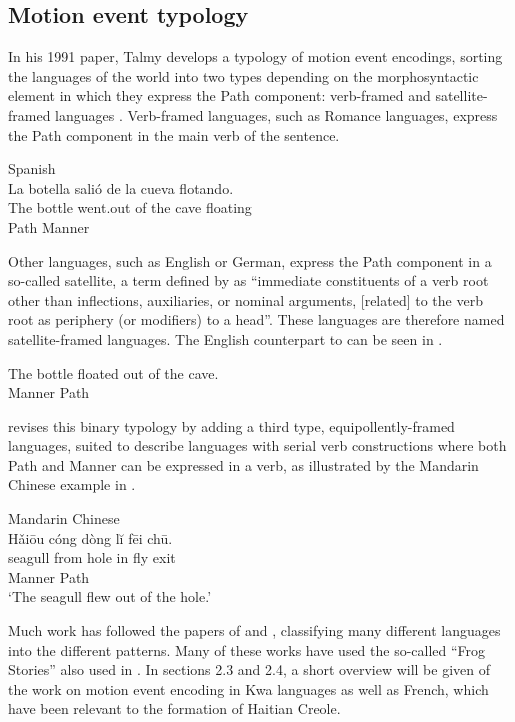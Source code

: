 \documentclass[output=paper,colorlinks,citecolor=brown]{langscibook}
\begin{document}
\subsection{Motion event typology}

In his 1991 paper, Talmy develops a typology of motion event encodings, sorting the languages of the world into two types depending on the morphosyntactic element in which they express the Path component: verb-framed and satellite-framed languages \citep[486--487]{Talmy_1991}. Verb-framed languages, such as Romance languages, express the Path component in the main verb of the sentence.

\ea Spanish \citep[69]{Talmy_1985} \\\label{ex:3:2}
\glll La botella salió de la cueva flotando.\\
      The bottle went.out of the cave floating \\
      {}  {}     Path     {} {} {} Manner\\
\z
	                     	
Other languages, such as English or German, express the Path component in a so-called satellite, a term defined by \citet[102]{Talmy_1985} as “immediate constituents of a verb root other than inflections, auxiliaries, or nominal arguments, [related] to the verb root as periphery (or modifiers) to a head”. These languages are therefore named satellite-framed languages. The English counterpart to  can be seen in .

\ea\label{ex:3:3}
\gll  The bottle floated {out of the cave}.\\
      {}  {}      Manner Path\\
\z
						
\citet{Slobin_2004} revises this binary typology by adding a third type, equipollently-framed languages, suited to describe languages with serial verb constructions where both Path and Manner can be expressed in a verb, as illustrated by the Mandarin Chinese example in .

\ea\label{ex:3:4}Mandarin Chinese\\
\glll  Hǎiōu cóng dòng l\u{i} fēi chū.\\
       seagull from hole in fly exit\\
       {}      {}   {}   {}  Manner Path\\
\glt `The seagull flew out of the hole.'
\z

Much work has followed the papers of \citet{Talmy_1991} and \citet{Slobin_2004}, classifying many different languages into the different patterns. Many of these works have used the so-called “Frog Stories” also used in \citet{Slobin_2004}. In sections 2.3 and 2.4, a short overview will be given of the work on motion event encoding in Kwa languages as well as French, which have been relevant to the formation of Haitian Creole.
\end{document}

